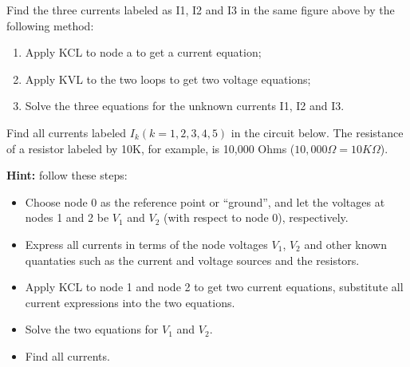 

\item Find the three currents labeled as I1, I2 and I3 in the same figure 
	above by the following method:
\begin{enumerate}
\item Apply KCL to node a to get a current equation;
\item Apply KVL to the two loops to get two voltage equations;
\item Solve the three equations for the unknown currents I1, I2 and I3.
\end{enumerate}


\item Find all currents labeled $I_k (k=1,2,3,4,5)$ in the circuit below. 
The resistance of a resistor labeled by 10K, for example, is 10,000
Ohms ($10,000 \Omega=10K\Omega$).

{\bf Hint:} follow these steps:
\begin{itemize}
\item Choose node 0 as the reference point or ``ground'', and let the 
	voltages at nodes 1 and 2 be $V_1$ and $V_2$ (with respect to
	node 0), respectively. 
\item Express all currents in terms of the node voltages $V_1$, $V_2$
	and other known quantaties such as the current and voltage sources
	and the resistors.
\item Apply KCL to node 1 and node 2 to get two current equations, 
	substitute all current expressions into the two equations.
\item Solve the two equations for $V_1$ and $V_2$.
\item Find all currents.
\end{itemize}



